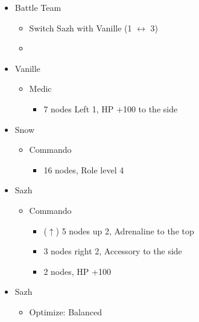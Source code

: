 	\begin{menu}
		\begin{itemize}
			\paradigm
			\begin{itemize}
				\item Battle Team
				      \begin{itemize}
					      \item Switch Sazh with Vanille (1 $\leftrightarrow$ 3)
					      \item {}%
					            {\paradigmline{(\rav)}{(\rav)}{(\syn)}}%
					            {\paradigmline{\com)}{\com}{\com}}%
					            {\paradigmline{\rav)}{\sen}{\rav}}%
					            {\paradigmline{\med}{\com}{\com}}%
					            {\paradigmline[5]{\textit{(\sab)}}{\textit{(\rav)}}{\textit{\rav}}}%
					            {\paradigmline{\rav}{\rav}{\rav}}
				      \end{itemize}
			\end{itemize}
			\crystarium
			\begin{itemize}
				\item Vanille
				      \begin{itemize}
					      \item Medic
					            \begin{itemize}
						            \item 7 nodes Left 1, HP +100 to the side
					            \end{itemize}
				      \end{itemize}
				\item Snow
				      \begin{itemize}
					      \item Commando
					            \begin{itemize}
						            \item 16 nodes, Role level 4
					            \end{itemize}
				      \end{itemize}
				\item Sazh
				      \begin{itemize}
					      \item Commando
					            \begin{itemize}
						            \item ($\uparrow$) 5 nodes up 2, Adrenaline to the top
						            \item 3 nodes right 2, Accessory to the side
						            \item 2 nodes, HP +100
					            \end{itemize}
				      \end{itemize}
			\end{itemize}
			\equip
			\begin{itemize}
				\item Sazh
				      \begin{itemize}
					      \item Optimize: Balanced
				      \end{itemize}
			\end{itemize}
		\end{itemize}
	\end{menu}

